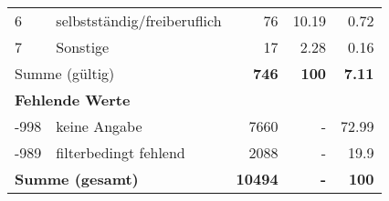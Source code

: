 \begin{longtable}{lXrrr}
     6 &
     \multicolumn{1}{X}{ selbstständig/freiberuflich   } &


       \num{76} &
       \num[round-mode=places,round-precision=2]{10.19} &
         \num[round-mode=places,round-precision=2]{0.72} \\

     7 &
     \multicolumn{1}{X}{ Sonstige   } &


       \num{17} &
       \num[round-mode=places,round-precision=2]{2.28} &
         \num[round-mode=places,round-precision=2]{0.16} \\
     \midrule
     \multicolumn{2}{l}{Summe (gültig)} &
       \textbf{\num{746}} &
     \textbf{\num{100}} &
       \textbf{\num[round-mode=places,round-precision=2]{7.11}} \\
     \multicolumn{5}{l}{\textbf{Fehlende Werte}}\\
       -998 &
       keine Angabe &
         \num{7660} &
        - &
         \num[round-mode=places,round-precision=2]{72.99} \\
       -989 &
       filterbedingt fehlend &
         \num{2088} &
        - &
         \num[round-mode=places,round-precision=2]{19.9} \\
     \midrule
     \multicolumn{2}{l}{\textbf{Summe (gesamt)}} &
          \textbf{\num{10494}} &
        \textbf{-} &
        \textbf{\num{100}} \\
     \bottomrule
     \end{longtable}
     
